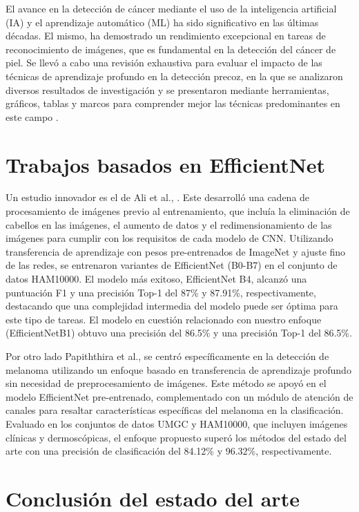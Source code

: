 El avance en la detección de cáncer mediante el uso de la inteligencia artificial (IA) y el aprendizaje automático (ML) ha sido significativo en 
las últimas décadas. El mismo, ha demostrado un rendimiento excepcional en tareas de reconocimiento de imágenes, que es fundamental en la detección 
del cáncer de piel. Se llevó a cabo una revisión exhaustiva para evaluar el impacto de las técnicas de aprendizaje profundo en la detección precoz, 
en la que se analizaron diversos resultados de investigación y se presentaron mediante herramientas, gráficos, tablas y marcos para comprender mejor 
las técnicas predominantes en este campo .

\section {Trabajos basados en EfficientNet}

Un estudio innovador es el de Ali et al., . Este desarrolló una cadena de procesamiento de imágenes previo al entrenamiento, que incluía la eliminación de cabellos en las imágenes, el aumento de datos y el redimensionamiento de las imágenes para cumplir con los requisitos de cada modelo de CNN. Utilizando transferencia de aprendizaje con pesos pre-entrenados de ImageNet y ajuste fino de las redes, se entrenaron variantes de EfficientNet (B0-B7) en el conjunto de datos HAM10000. El modelo más exitoso, EfficientNet B4, alcanzó una puntuación F1 y una precisión Top-1 del 87\% y 87.91\%, respectivamente, destacando que una complejidad intermedia del modelo puede ser óptima para este tipo de tareas. El modelo en cuestión relacionado con nuestro enfoque (EfficientNetB1) obtuvo una precisión del 86.5\% y una precisión Top-1 del 86.5\%.

Por otro lado Papiththira et al.,  se centró específicamente en la detección de melanoma utilizando un enfoque basado en transferencia de aprendizaje profundo sin necesidad de preprocesamiento de imágenes. Este método se apoyó en el modelo EfficientNet pre-entrenado, complementado con un módulo de atención de canales para resaltar características específicas del melanoma en la clasificación. Evaluado en los conjuntos de datos UMGC y HAM10000, que incluyen imágenes clínicas y dermoscópicas, el enfoque propuesto superó los métodos del estado del arte con una precisión de clasificación del 84.12\% y 96.32\%, respectivamente.

\section{Conclusión del estado del arte}

